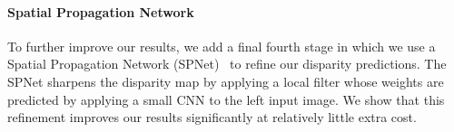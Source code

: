\documentclass[letterpaper, 10 pt, conference]{ieeeconf}
\newcommand{\spnlong}[1]{Spatial Propagation Network}
\newcommand{\spnshort}[1]{SPNet}
\begin{document}
\paragraph{\spnlong{}}
To further improve our results, we add a final fourth stage in which we use a \spnlong{} (\spnshort{})~\cite{liu2017learning} to refine our disparity predictions. The \spnshort{} sharpens the disparity map by applying a local filter whose weights are predicted by applying a small CNN to the left input image. We show that this refinement improves our results significantly at relatively little extra cost. 
\end{document}
